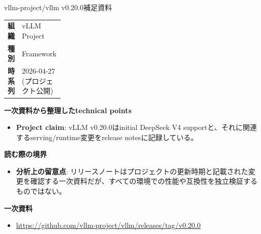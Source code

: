 \begin{technicalnote}{vllm-project/vllm v0.20.0}{補足資料}
\begingroup
\begin{tabularx}{\linewidth}{@{}>{\bfseries}p{0.22\linewidth}X@{}}
組織 & vLLM Project \\
種別 & Framework \\
時系列 & 2026-04-27 (プロジェクト公開) \\
\end{tabularx}
\smallskip
{\bfseries 一次資料から整理したtechnical points}
\begin{itemize}[leftmargin=1.5em,itemsep=0.35em]
\item \textbf{Project claim}: vLLM v0.20.0はinitial DeepSeek V4 supportと、それに関連するserving/runtime変更をrelease notesに記録している。
\end{itemize}
\begin{minipage}{\linewidth}
{\bfseries 読む際の境界}
\begin{itemize}[leftmargin=1.5em,itemsep=0.35em]
\item \textbf{分析上の留意点}: リリースノートはプロジェクトの更新時期と記載された変更を確認する一次資料だが、すべての環境での性能や互換性を独立検証するものではない。
\end{itemize}
\begin{samepage}
{\bfseries 一次資料}
\begingroup\sloppy
\begin{itemize}[leftmargin=1.5em,itemsep=0.25em]
\item {\scriptsize\url{https://github.com/vllm-project/vllm/releases/tag/v0.20.0}}
\end{itemize}
\endgroup
\end{samepage}
\end{minipage}
\endgroup
\end{technicalnote}
\medskip

